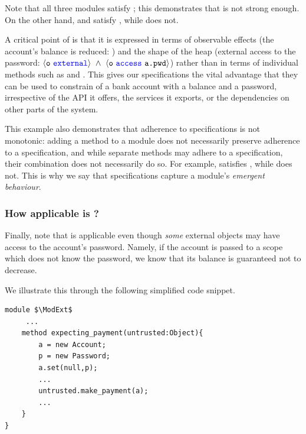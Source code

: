  {Note that all three modules   satisfy  \SrobustA;  this demonstrates that \SrobustA is not
strong enough. On the other hand, \ModA and \ModC satisfy \SrobustB, while \ModB does not.  }

A critical point of \SrobustB %
is that it is
expressed in terms of observable effects (the account's balance is
reduced: ) and the shape of the heap 
(external access to the password:
$\external{\prg{o}}\ \wedge\ \access{\prg{o}}{\prg{a.pwd}}$) 
rather than in terms of individual methods such as
 and .
This gives our specifications the
vital advantage that they can be used to constrain
 of a bank account with a balance and a
password, irrespective of the API it
offers, the services it exports, or the dependencies on other parts of
the system.

 This example also demonstrates that 
adherence to   \Nec specifications is not monotonic:
adding a method to a module does not necessarily preserve adherence to
a specification, 
and while separate methods may adhere to a  specification, their combination does
not necessarily do so. 
{For example, \ModA satisfies \SrobustB, while \ModB does not.}
This is why we say that \Nec   specifications capture a module's \emph{emergent behaviour}. 
 

\subsubsection{How applicable is  \SrobustB?}
\label{sec:how}
Finally,  {note that \SrobustB is applicable even though \emph{some} external objects may have access
to the account's password. 
Namely, if the account is passed to a scope which does not know the password, we 
know that its balance is guaranteed not to decrease. %
}

 
We illustrate this through the following simplified code snippet.
 

\begin{lstlisting}[mathescape=true, language=chainmail, frame=lines]
module $\ModExt$
     ...
    method expecting_payment(untrusted:Object){ 
        a = new Account;
        p = new Password; 
        a.set(null,p);
        ...
        untrusted.make_payment(a);
        ...
    }
}
\end{lstlisting}
 

